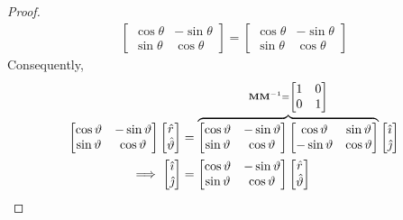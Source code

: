 \begin{lemma}
\begin{proof}
\begin{align*}
\begin{bmatrix}
                \cos\theta&-\sin\theta\\
                \sin\theta&\cos\theta
            \end{bmatrix}=\begin{bmatrix}
                \cos\theta&-\sin\theta\\
                \sin\theta&\cos\theta
            \end{bmatrix}
        \end{align*}
        Consequently,
        \begin{align*}
            \begin{bmatrix}
                \cos\vartheta&-\sin\vartheta\\
                \sin\vartheta&\cos\vartheta
            \end{bmatrix}\begin{bmatrix}
                \hat{r}\\
                \hat{\vartheta}
            \end{bmatrix}&=\overbrace{\begin{bmatrix}
                \cos\vartheta&-\sin\vartheta\\
                \sin\vartheta&\cos\vartheta
            \end{bmatrix}\begin{bmatrix}
                \cos\vartheta&\sin\vartheta\\
                -\sin\vartheta&\cos\vartheta
            \end{bmatrix}}^{\mathbf{M}\mathbf{M}^{-1}=\begin{bmatrix}
                1&0\\
                0&1
            \end{bmatrix}}\begin{bmatrix}
                \hat{\imath}\\
                \hat{\jmath}
            \end{bmatrix}\\
            \implies\begin{bmatrix}
                \hat{\imath}\\
                \hat{\jmath}
            \end{bmatrix}&=\begin{bmatrix}
                \cos\vartheta&-\sin\vartheta\\
                \sin\vartheta&\cos\vartheta
            \end{bmatrix}\begin{bmatrix}
                \hat{r}\\
                \hat{\vartheta}

\end{bmatrix}
\end{align*}
\end{proof}
\end{lemma}
